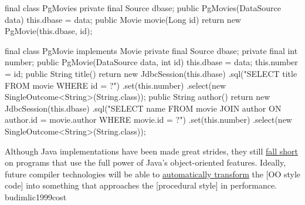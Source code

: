 \documentclass{article}
\begin{document}
\begin{pptWide}{2}
{\small\begin{ffcode}
final class PgMovies
  private final Source dbase;
  public PgMovies(DataSource data)
    this.dbase = data;
  public Movie movie(Long id)
    return new PgMovie(this.dbase, id);
\end{ffcode}
}
\par\columnbreak\par
{\scriptsize\begin{ffcode}
final class PgMovie implements Movie
  private final Source dbase;
  private final int number;
  public PgMovie(DataSource data, int id)
    this.dbase = data;
    this.number = id;
  public String title()
    return new JdbcSession(this.dbase)
      .sql("SELECT title FROM movie WHERE id = ?")
      .set(this.number)
      .select(new SingleOutcome<String>(String.class));
  public String author()
    return new JdbcSession(this.dbase)
      .sql("SELECT name FROM movie JOIN author ON author.id = movie.author WHERE movie.id = ?")
      .set(this.number)
      .select(new SingleOutcome<String>(String.class));
\end{ffcode}
}
\end{pptWide}
\par
\plush{}



  {Although Java implementations have been made great strides, they still \ul{fall short} on programs that use the full power of Java's object-oriented features. Ideally, future compiler technologies will be able to \ul{automatically transform} the [OO style code] into something that approaches the [procedural style] in performance.}
  {budimlic1999cost}
\end{document}

